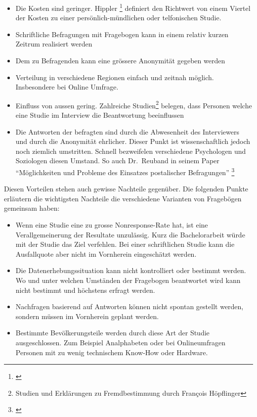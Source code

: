 \begin{itemize}
\tightlist
\item
  Die Kosten sind geringer. Hippler \footnote{\autocite{hippler}}
  definiert den Richtwert von einem Viertel der Kosten zu einer
  persönlich-mündlichen oder telfonischen Studie.
\item
  Schriftliche Befragungen mit Fragebogen kann in einem relativ kurzen
  Zeitrum realisiert werden
\item
  Dem zu Befragenden kann eine grössere Anonymität gegeben werden
\item
  Verteilung in verschiedene Regionen einfach und zeitnah möglich.
  Insbesondere bei Online Umfrage.
\item
  Einfluss von aussen gering. Zahlreiche Studien\footnote{Studien und
    Erklärungen zu Fremdbestimmung durch François
    Höpflinger\autocite{umfragemethodik}} belegen, dass Personen welche
  eine Studie im Interview die Beantwortung beeinflussen
\item
  Die Antworten der befragten sind durch die Abwesenheit des
  Interviewers und durch die Anonymität ehrlicher. Dieser Punkt ist
  wissenschaftlich jedoch noch ziemlich umstritten. Schnell bezweifelen
  verschiedene Psychologen und Soziologen diesen Umstand. So auch
  Dr.~Reuband in seinem Paper ``Möglichkeiten und Probleme des Einsatzes
  postalischer Befragungen'' \footnote{\autocite{kzfss01}}
\end{itemize}

Diesen Vorteilen stehen auch gewisse Nachteile gegenüber. Die folgenden
Punkte erläutern die wichtigsten Nachteile die verschiedene Varianten
von Fragebögen gemeinsam haben:

\begin{itemize}
\tightlist
\item
  Wenn eine Studie eine zu grosse Nonresponse-Rate hat, ist eine
  Verallgemeinerung der Resultate unzulässig. Kurz die Bachelorarbeit
  würde mit der Studie das Ziel verfehlen. Bei einer schriftlichen
  Studie kann die Ausfallquote aber nicht im Vornherein eingeschätzt
  werden.
\item
  Die Datenerhebungssituation kann nicht kontrolliert oder bestimmt
  werden. Wo und unter welchen Umständen der Fragebogen beantwortet wird
  kann nicht bestimmt und höchstens erfragt werden.
\item
  Nachfragen basierend auf Antworten können nicht spontan gestellt
  werden, sondern müssen im Vornherein geplant werden.
\item
  Bestimmte Bevölkerungsteile werden durch diese Art der Studie
  ausgeschlossen. Zum Beispiel Analphabeten oder bei Onlineumfragen
  Personen mit zu wenig technischem Know-How oder Hardware.
\end{itemize}

